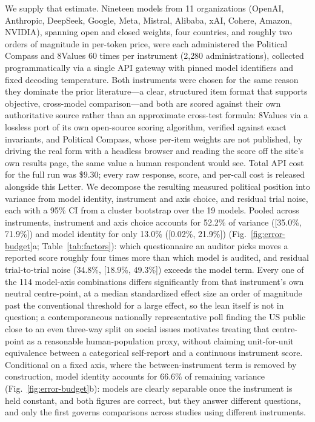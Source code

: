 \documentclass[11pt]{article}
\begin{document}
We supply that estimate. Nineteen models from 11 organizations (OpenAI,
Anthropic, DeepSeek, Google, Meta, Mistral, Alibaba, xAI, Cohere, Amazon,
NVIDIA), spanning open and closed weights, four countries, and roughly two
orders of magnitude in per-token price, were each administered the Political
Compass and 8Values 60 times per instrument (2{,}280 administrations),
collected programmatically via a single API gateway with pinned model
identifiers and fixed decoding temperature. Both instruments were chosen
for the same reason they dominate the prior literature---a clear, structured
item format that supports objective, cross-model comparison---and both are
scored against their own authoritative source rather than an approximate
cross-test formula: 8Values via a lossless port of its own open-source
scoring algorithm, verified against exact invariants, and Political
Compass, whose per-item weights are not published, by driving the real
form with a headless browser and reading the score off the site's own
results page, the same value a human respondent would see. Total API cost
for the full run was \$9.30; every raw response, score, and per-call cost
is released alongside this Letter. We decompose the resulting
measured political position into variance from model identity, instrument
and axis choice, and residual trial noise, each with a 95\% CI from a
cluster bootstrap over the 19 models. Pooled
across instruments, instrument and axis choice accounts for 52.2\% of
variance ([35.0\%, 71.9\%]) and model identity for only 13.0\% ([0.02\%,
21.9\%]) (Fig.~\ref{fig:error-budget}a; Table~\ref{tab:factors}): which
questionnaire an auditor picks moves a reported score roughly four times
more than which model is audited, and residual trial-to-trial noise (34.8\%,
[18.9\%, 49.3\%]) exceeds the model term. Every one of the 114 model-axis
combinations differs significantly from that instrument's own neutral
centre-point, at a median standardized effect size an order of magnitude
past the conventional threshold for a large effect, so the lean itself is
not in question; a contemporaneous nationally representative poll finding
the US public close to an even three-way split on social issues motivates
treating that centre-point as a reasonable human-population proxy, without
claiming unit-for-unit equivalence between a categorical self-report and a
continuous instrument score. Conditional on a fixed axis, where
the between-instrument term is removed by construction, model identity
accounts for 66.6\% of remaining variance (Fig.~\ref{fig:error-budget}b):
models are clearly separable once the instrument is held constant, and both
figures are correct, but they answer different questions, and only the
first governs comparisons across studies using different instruments.
\end{document}
